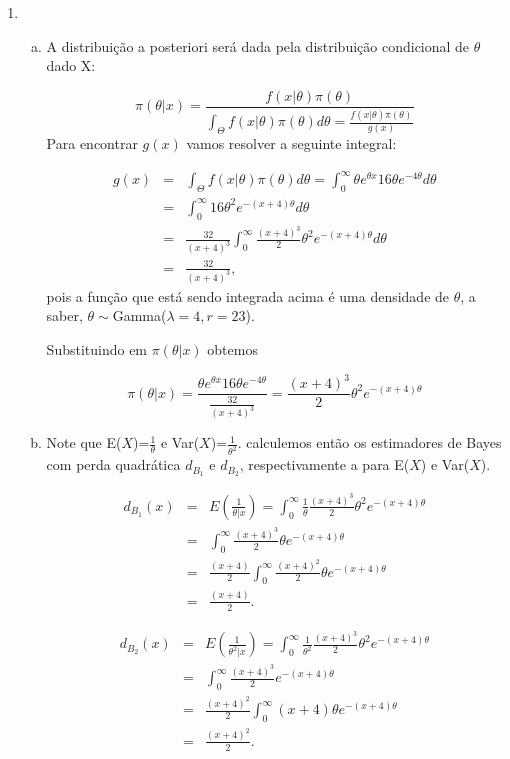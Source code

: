 \documentclass[10pt,brazil,addpoints]{exam}
\begin{document}
\begin{enumerate}[1.]
\begin{enumerate}[a)]
\end{enumerate}

\item 
\begin{enumerate}[a)]
\item 


A distribuição a posteriori será dada pela distribuição  condicional de $\theta$ dado X:

\[\pi(\theta|x)=\frac{f(x|\theta)\pi(\theta)}{\int_{\Theta}f(x|\theta)\pi(\theta)d\theta=\frac{f(x|\theta)\pi(\theta)}{g(x)} }\]
Para encontrar $g(x)$ vamos resolver a seguinte integral:

\begin{eqnarray}
g(x)&=&\int_{\Theta}f(x|\theta)\pi(\theta)d\theta=\int_{0}^{\infty}\theta e^{\theta x} 16\theta e^{-4\theta}d\theta\\
&=&\int_{0}^{\infty}16\theta^2 e^{-(x+4)\theta }d\theta\\
&=&\frac{32}{(x+4)^3} \int_{0}^{\infty}  \frac{(x+4)^3}{2}\theta^2 e^{-(x+4)\theta}d\theta\\
&=&\frac{32}{(x+4)^3},
\end{eqnarray}
pois a função que está sendo integrada acima é uma densidade de $\theta$, a saber, $\theta\sim $Gamma($\lambda=4,r=23$).

Substituindo em $\pi(\theta|x)$ obtemos 

\[\pi(\theta|x)=\frac{\theta e^{\theta x} 16\theta e^{-4\theta}}{\frac{32}{(x+4)^3}}=\frac{(x+4)^3}{2}\theta^2 e^{-(x+4)\theta}\]

\item Note que E($X$)=$\frac{1}{\theta}$ e Var($X$)=$\frac{1}{\theta^2}$. calculemos então os estimadores de Bayes com perda quadrática $d_{B_1}$ e $d_{B_2}$, respectivamente a para E($X$) e Var($X$).

\begin{eqnarray}
d_{B_1}(x)&=&E(\frac{1}{\theta|x})=\int_{0}^{\infty}\frac{1}{\theta}\frac{(x+4)^3}{2}\theta^2
 e^{-(x+4)\theta}\\
 &=&\int_{0}^{\infty}\frac{(x+4)^3}{2}\theta e^{-(x+4)\theta}\\
 &=& \frac{(x+4)}{2}\int_{0}^{\infty}\frac{(x+4)^2}{2}\theta e^{-(x+4)\theta}\\
 &=& \frac{(x+4)}{2}.
\end{eqnarray}


\begin{eqnarray}
d_{B_2}(x)&=&E(\frac{1}{\theta^2|x})=\int_{0}^{\infty}\frac{1}{\theta^2}\frac{(x+4)^3}{2}\theta^2
 e^{-(x+4)\theta}\\
 &=&\int_{0}^{\infty}\frac{(x+4)^3}{2}e^{-(x+4)\theta}\\
 &=& \frac{(x+4)^2}{2}\int_{0}^{\infty}(x+4)\theta e^{-(x+4)\theta}\\
 &=& \frac{(x+4)^2}{2}.
\end{eqnarray}




\end{enumerate}



\end{enumerate}
\end{document}
